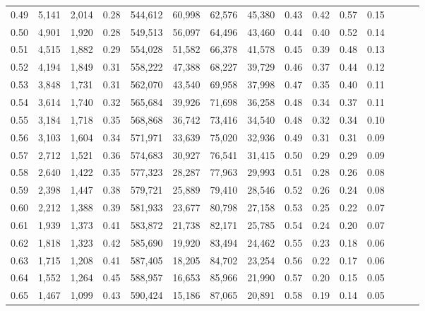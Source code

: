 \begin{tabular}{rrrrrrrrrrrrrrr}
0.49 &   5,141 &  2,014 &  0.28 &  544,612 &   60,998 &   62,576 &   45,380 &  0.43 &  0.42 &  0.57 &      0.15 \\
0.50 &   4,901 &  1,920 &  0.28 &  549,513 &   56,097 &   64,496 &   43,460 &  0.44 &  0.40 &  0.52 &      0.14 \\
0.51 &   4,515 &  1,882 &  0.29 &  554,028 &   51,582 &   66,378 &   41,578 &  0.45 &  0.39 &  0.48 &      0.13 \\
0.52 &   4,194 &  1,849 &  0.31 &  558,222 &   47,388 &   68,227 &   39,729 &  0.46 &  0.37 &  0.44 &      0.12 \\
0.53 &   3,848 &  1,731 &  0.31 &  562,070 &   43,540 &   69,958 &   37,998 &  0.47 &  0.35 &  0.40 &      0.11 \\
0.54 &   3,614 &  1,740 &  0.32 &  565,684 &   39,926 &   71,698 &   36,258 &  0.48 &  0.34 &  0.37 &      0.11 \\
0.55 &   3,184 &  1,718 &  0.35 &  568,868 &   36,742 &   73,416 &   34,540 &  0.48 &  0.32 &  0.34 &      0.10 \\
0.56 &   3,103 &  1,604 &  0.34 &  571,971 &   33,639 &   75,020 &   32,936 &  0.49 &  0.31 &  0.31 &      0.09 \\
0.57 &   2,712 &  1,521 &  0.36 &  574,683 &   30,927 &   76,541 &   31,415 &  0.50 &  0.29 &  0.29 &      0.09 \\
0.58 &   2,640 &  1,422 &  0.35 &  577,323 &   28,287 &   77,963 &   29,993 &  0.51 &  0.28 &  0.26 &      0.08 \\
0.59 &   2,398 &  1,447 &  0.38 &  579,721 &   25,889 &   79,410 &   28,546 &  0.52 &  0.26 &  0.24 &      0.08 \\
0.60 &   2,212 &  1,388 &  0.39 &  581,933 &   23,677 &   80,798 &   27,158 &  0.53 &  0.25 &  0.22 &      0.07 \\
0.61 &   1,939 &  1,373 &  0.41 &  583,872 &   21,738 &   82,171 &   25,785 &  0.54 &  0.24 &  0.20 &      0.07 \\
0.62 &   1,818 &  1,323 &  0.42 &  585,690 &   19,920 &   83,494 &   24,462 &  0.55 &  0.23 &  0.18 &      0.06 \\
0.63 &   1,715 &  1,208 &  0.41 &  587,405 &   18,205 &   84,702 &   23,254 &  0.56 &  0.22 &  0.17 &      0.06 \\
0.64 &   1,552 &  1,264 &  0.45 &  588,957 &   16,653 &   85,966 &   21,990 &  0.57 &  0.20 &  0.15 &      0.05 \\
0.65 &   1,467 &  1,099 &  0.43 &  590,424 &   15,186 &   87,065 &   20,891 &  0.58 &  0.19 &  0.14 &      0.05 \\

\end{tabular}
